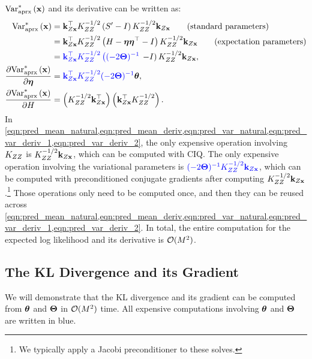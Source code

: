 $\text{Var}^*_\text{aprx} \left( \mathbf{x} \right)$ and its derivative can be written as:
%
\begin{align}
  \text{Var}^*_\text{aprx} \left( \mathbf{x} \right)
  &= \mathbf{k}_{Z \mathbf{x}}^\top K_{ZZ}^{-1/2} \left( S' - I \right) K_{ZZ}^{-1/2} \mathbf{k}_{Z \mathbf{x}}
  \tag{standard parameters} \\
  &= \mathbf{k}_{Z \mathbf{x}}^\top K_{ZZ}^{-1/2} \left( H - \boldsymbol{\eta} \boldsymbol{\eta}^\top - I \right) K_{ZZ}^{-1/2} \mathbf{k}_{Z \mathbf{x}}
  \tag{expectation parameters} \\
  &= {\color{blue} \mathbf{k}_{Z \mathbf{x}}^\top K_{ZZ}^{-1/2} \left((-2 \boldsymbol{\Theta})^{-1} \right.} \left. - I \right) K_{ZZ}^{-1/2} \mathbf{k}_{Z \mathbf{x}}
  \label{eqn:pred_var_natural},
  \\
  \frac{\partial \text{Var}^*_\text{aprx} \left( \mathbf{x} \right)}{\partial \boldsymbol{\eta}}
  &= {\color{blue} \mathbf{k}_{Z \mathbf{x}}^\top K_{ZZ}^{-1/2} (-2 \boldsymbol{\Theta})^{-1}} \boldsymbol{\theta}
  \label{eqn:pred_var_deriv_1},
  \\
  \frac{\partial \text{Var}^*_\text{aprx} \left( \mathbf{x} \right)}{\partial H}
  &= \left( K_{ZZ}^{-1/2} \mathbf{k}_{Z \mathbf{x}}^\top \right) \left( \mathbf{k}_{Z \mathbf{x}}^\top K_{ZZ}^{-1/2} \right)
  \label{eqn:pred_var_deriv_2}.
\end{align}
%
In \cref{eqn:pred_mean_natural,eqn:pred_mean_deriv,eqn:pred_var_natural,eqn:pred_var_deriv_1,eqn:pred_var_deriv_2}, the only expensive operation involving $K_{ZZ}$ is $K_{ZZ}^{-1/2} \mathbf{k}_{Z \mathbf{x}}$, which can be computed with CIQ.
The only expensive operation involving the variational parameters is ${\color{blue} (-2 \boldsymbol{\Theta})^{-1} K_{ZZ}^{-1/2} \mathbf{k}_{Z \mathbf{x}}}$, which can be computed with preconditioned conjugate gradients after computing $K_{ZZ}^{-1/2} \mathbf{k}_{Z \mathbf{x}}$.\footnote{
  We typically apply a Jacobi preconditioner to these solves.
}
Those operations only need to be computed once, and then they can be reused across \cref{eqn:pred_mean_natural,eqn:pred_mean_deriv,eqn:pred_var_natural,eqn:pred_var_deriv_1,eqn:pred_var_deriv_2}.
In total, the entire computation for the expected log likelihood and its derivative is $\bigo{M^2}$.

\subsection{The KL Divergence and its Gradient}
We will demonstrate that the KL divergence and its gradient can be computed from $\boldsymbol{\theta}$ and $\boldsymbol{\Theta}$ in $\bigo{M^2}$ time.
All expensive computations involving $\boldsymbol{\theta}$ and $\boldsymbol{\Theta}$ are written in {\color{blue} blue}.

